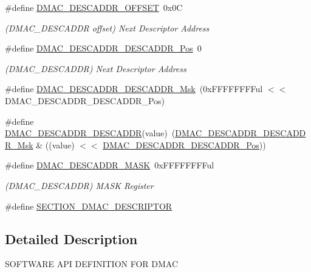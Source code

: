 \begin{DoxyCompactItemize}
\#define \mbox{\hyperlink{group___s_a_m_d21___d_m_a_c_gac8d037cbab1cc4bac9e23bbb54f73998}{D\+M\+A\+C\+\_\+\+D\+E\+S\+C\+A\+D\+D\+R\+\_\+\+O\+F\+F\+S\+ET}}~0x0C
\begin{DoxyCompactList}\small\item\em (D\+M\+A\+C\+\_\+\+D\+E\+S\+C\+A\+D\+DR offset) Next Descriptor Address \end{DoxyCompactList}\item 
\#define \mbox{\hyperlink{group___s_a_m_d21___d_m_a_c_gadc677fbace02e86b543495c36920e405}{D\+M\+A\+C\+\_\+\+D\+E\+S\+C\+A\+D\+D\+R\+\_\+\+D\+E\+S\+C\+A\+D\+D\+R\+\_\+\+Pos}}~0
\begin{DoxyCompactList}\small\item\em (D\+M\+A\+C\+\_\+\+D\+E\+S\+C\+A\+D\+DR) Next Descriptor Address \end{DoxyCompactList}\item 
\#define \mbox{\hyperlink{group___s_a_m_d21___d_m_a_c_gafc8a36fa8a08775ebbb634f97170f868}{D\+M\+A\+C\+\_\+\+D\+E\+S\+C\+A\+D\+D\+R\+\_\+\+D\+E\+S\+C\+A\+D\+D\+R\+\_\+\+Msk}}~(0x\+F\+F\+F\+F\+F\+F\+F\+Ful $<$$<$ D\+M\+A\+C\+\_\+\+D\+E\+S\+C\+A\+D\+D\+R\+\_\+\+D\+E\+S\+C\+A\+D\+D\+R\+\_\+\+Pos)
\item 
\#define \mbox{\hyperlink{group___s_a_m_d21___d_m_a_c_gaeb483ef19c5358fba1c6b4ab5e247007}{D\+M\+A\+C\+\_\+\+D\+E\+S\+C\+A\+D\+D\+R\+\_\+\+D\+E\+S\+C\+A\+D\+DR}}(value)~(\mbox{\hyperlink{group___s_a_m_d21___d_m_a_c_gafc8a36fa8a08775ebbb634f97170f868}{D\+M\+A\+C\+\_\+\+D\+E\+S\+C\+A\+D\+D\+R\+\_\+\+D\+E\+S\+C\+A\+D\+D\+R\+\_\+\+Msk}} \& ((value) $<$$<$ \mbox{\hyperlink{group___s_a_m_d21___d_m_a_c_gadc677fbace02e86b543495c36920e405}{D\+M\+A\+C\+\_\+\+D\+E\+S\+C\+A\+D\+D\+R\+\_\+\+D\+E\+S\+C\+A\+D\+D\+R\+\_\+\+Pos}}))
\item 
\#define \mbox{\hyperlink{group___s_a_m_d21___d_m_a_c_ga2aef9cdfe20f976054c42acd853ddc8e}{D\+M\+A\+C\+\_\+\+D\+E\+S\+C\+A\+D\+D\+R\+\_\+\+M\+A\+SK}}~0x\+F\+F\+F\+F\+F\+F\+F\+Ful
\begin{DoxyCompactList}\small\item\em (D\+M\+A\+C\+\_\+\+D\+E\+S\+C\+A\+D\+DR) M\+A\+SK Register \end{DoxyCompactList}\item 
\#define \mbox{\hyperlink{group___s_a_m_d21___d_m_a_c_ga175e774944cf7ad6f81a9adcf515000b}{S\+E\+C\+T\+I\+O\+N\+\_\+\+D\+M\+A\+C\+\_\+\+D\+E\+S\+C\+R\+I\+P\+T\+OR}}
\end{DoxyCompactItemize}


\subsection{Detailed Description}
S\+O\+F\+T\+W\+A\+RE A\+PI D\+E\+F\+I\+N\+I\+T\+I\+ON F\+OR D\+M\+AC 

